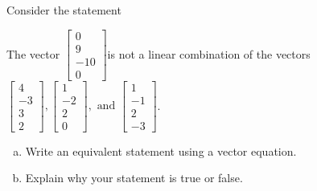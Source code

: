 
\begin{exerciseStatement}


Consider the statement 
\begin{center}\begin{minipage}{0.8\textwidth}
 The vector \( \left[\begin{array}{c}
0 \\
9 \\
-10 \\
0
\end{array}\right] \)is not a linear combination of the vectors \( \left[\begin{array}{c}
4 \\
-3 \\
3 \\
2
\end{array}\right] , \left[\begin{array}{c}
1 \\
-2 \\
2 \\
0
\end{array}\right] , \text{ and } \left[\begin{array}{c}
1 \\
-1 \\
2 \\
-3
\end{array}\right] \). 
\end{minipage}\end{center}
    


\begin{enumerate}[(a)]
\item  Write an equivalent statement using a vector equation.
\item  Explain why your statement is true or false.
\end{enumerate}
    
\end{exerciseStatement}
    
